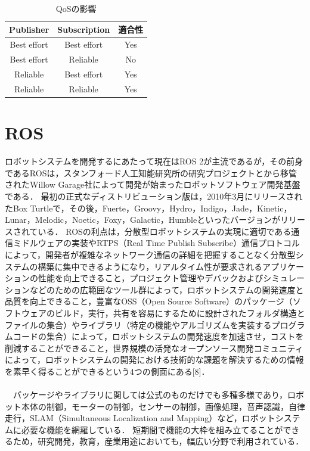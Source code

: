 \begin{table}[ht]
    \caption{QoSの影響}
    \label{tab:qos}
    \centering
    \begin{tabular}{|c|c|c|} \hline
      Publisher & Subscription & 適合性 \\ \hline
      Best effort & Best effort & Yes \\ \hline
      Best effort & Reliable & No \\ \hline
      Reliable & Best effort & Yes \\ \hline
      Reliable & Reliable & Yes \\ \hline
    \end{tabular}
  \end{table}
\section{ROS}
ロボットシステムを開発するにあたって現在はROS 2が主流であるが，その前身であるROSは，スタンフォード人工知能研究所の研究プロジェクトとから移管されたWillow Garage社によって開発が始まったロボットソフトウェア開発基盤である．
最初の正式なディストリビューション版は，2010年3月にリリースされたBox Turtleで，その後，Fuerte，Groovy，Hydro，Indigo，Jade，Kinetic，Lunar，Melodic，Noetic，Foxy，Galactic，Humbleといったバージョンがリリースされている．
ROSの利点は，分散型ロボットシステムの実現に適切である通信ミドルウェアの実装やRTPS（Real Time Publish Subscribe）通信プロトコルによって，開発者が複雑なネットワーク通信の詳細を把握することなく分散型システムの構築に集中できるようになり，リアルタイム性が要求されるアプリケーションの性能を向上できること，プロジェクト管理やデバックおよびシミュレーションなどのための広範囲なツール群によって，ロボットシステムの開発速度と品質を向上できること，豊富なOSS（Open Source Software）のパッケージ（ソフトウェアのビルド，実行，共有を容易にするために設計されたフォルダ構造とファイルの集合）やライブラリ（特定の機能やアルゴリズムを実装するプログラムコードの集合）によって，ロボットシステムの開発速度を加速させ，コストを削減することができること，世界規模の活発なオープンソース開発コミュニティによって，ロボットシステムの開発における技術的な課題を解決するための情報を素早く得ることができるという4つの側面にある[8]．\\
\\　パッケージやライブラリに関しては公式のものだけでも多種多様であり，ロボット本体の制御，モーターの制御，センサーの制御，画像処理，音声認識，自律走行，SLAM（Simultaneous Localization and Mapping）など，ロボットシステムに必要な機能を網羅している．
短期間で機能の大枠を組み立てることができるため，研究開発，教育，産業用途においても，幅広い分野で利用されている．\\
